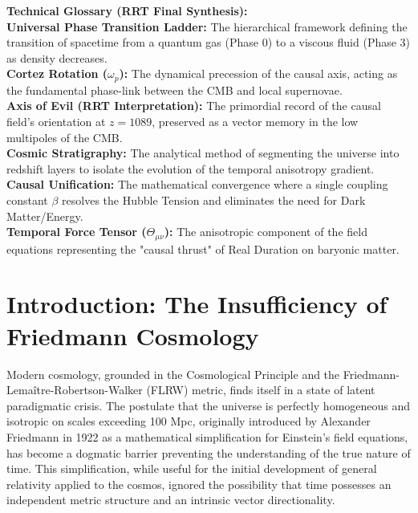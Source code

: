 \documentclass[12pt, a4paper]{article}
\begin{document}
\begin{center}
    \noindent \textbf{Technical Glossary (RRT Final Synthesis):} \\
    \textbf{Universal Phase Transition Ladder:} The hierarchical framework defining the transition of spacetime from a quantum gas (Phase 0) to a viscous fluid (Phase 3) as density decreases. \\
    \textbf{Cortez Rotation ($\omega_p$):} The dynamical precession of the causal axis, acting as the fundamental phase-link between the CMB and local supernovae. \\
    \textbf{Axis of Evil (RRT Interpretation):} The primordial record of the causal field's orientation at $z=1089$, preserved as a vector memory in the low multipoles of the CMB. \\
    \textbf{Cosmic Stratigraphy:} The analytical method of segmenting the universe into redshift layers to isolate the evolution of the temporal anisotropy gradient. \\
    \textbf{Causal Unification:} The mathematical convergence where a single coupling constant $\beta$ resolves the Hubble Tension and eliminates the need for Dark Matter/Energy. \\
    \textbf{Temporal Force Tensor ($\Theta_{\mu\nu}$):} The anisotropic component of the field equations representing the "causal thrust" of Real Duration on baryonic matter.
\end{center}
\vspace*{\fill}

\newpage

\section{Introduction: The Insufficiency of Friedmann Cosmology}

Modern cosmology, grounded in the Cosmological Principle and the Friedmann-Lemaître-\-Robertson-\-Walker (FLRW) metric, finds itself in a state of latent paradigmatic crisis. The postulate that the universe is perfectly homogeneous and isotropic on scales exceeding 100 Mpc, originally introduced by Alexander Friedmann in 1922 as a mathematical simplification for Einstein's field equations, has become a dogmatic barrier preventing the understanding of the true nature of time. This simplification, while useful for the initial development of general relativity applied to the cosmos, ignored the possibility that time possesses an independent metric structure and an intrinsic vector directionality.
\end{document}
